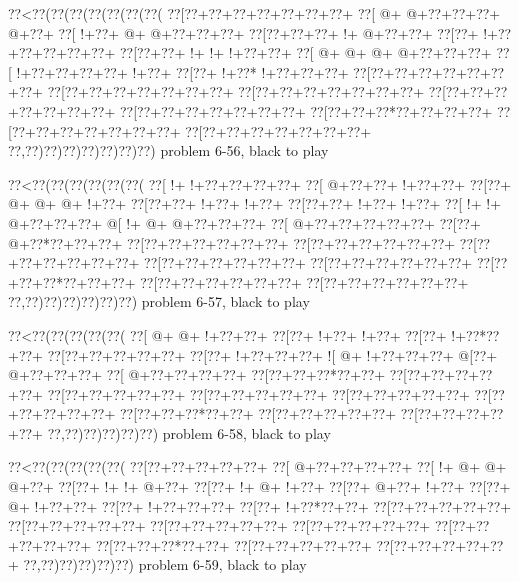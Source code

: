 \vbox{\vbox{\goo
\0??<\0??(\0??(\0??(\0??(\0??(\0??(\0??(
\0??[\0??+\0??+\0??+\0??+\0??+\0??+\0??+
\0??[\- @+\- @+\0??+\0??+\0??+\- @+\0??+
\0??[\- !+\0??+\- @+\- @+\0??+\0??+\0??+
\0??[\0??+\0??+\0??+\- !+\- @+\0??+\0??+
\0??[\0??+\- !+\0??+\0??+\0??+\0??+\0??+
\0??[\0??+\0??+\- !+\- !+\- !+\0??+\0??+
\0??[\- @+\- @+\- @+\- @+\0??+\0??+\0??+
\0??[\- !+\0??+\0??+\0??+\0??+\- !+\0??+
\0??[\0??+\- !+\0??*\- !+\0??+\0??+\0??+
\0??[\0??+\0??+\0??+\0??+\0??+\0??+\0??+
\0??[\0??+\0??+\0??+\0??+\0??+\0??+\0??+
\0??[\0??+\0??+\0??+\0??+\0??+\0??+\0??+
\0??[\0??+\0??+\0??+\0??+\0??+\0??+\0??+
\0??[\0??+\0??+\0??+\0??+\0??+\0??+\0??+
\0??[\0??+\0??+\0??*\0??+\0??+\0??+\0??+
\0??[\0??+\0??+\0??+\0??+\0??+\0??+\0??+
\0??[\0??+\0??+\0??+\0??+\0??+\0??+\0??+
\0??,\0??)\0??)\0??)\0??)\0??)\0??)\0??)
}
\hfil problem 6-56, black to play\hfil\break
}

\vbox{\vbox{\goo
\0??<\0??(\0??(\0??(\0??(\0??(\0??(
\0??[\- !+\- !+\0??+\0??+\0??+\0??+
\0??[\- @+\0??+\0??+\- !+\0??+\0??+
\0??[\0??+\- @+\- @+\- @+\- !+\0??+
\0??[\0??+\0??+\- !+\0??+\- !+\0??+
\0??[\0??+\0??+\- !+\0??+\- !+\0??+
\0??[\- !+\- !+\- @+\0??+\0??+\0??+
\- @[\- !+\- @+\- @+\0??+\0??+\0??+
\0??[\- @+\0??+\0??+\0??+\0??+\0??+
\0??[\0??+\- @+\0??*\0??+\0??+\0??+
\0??[\0??+\0??+\0??+\0??+\0??+\0??+
\0??[\0??+\0??+\0??+\0??+\0??+\0??+
\0??[\0??+\0??+\0??+\0??+\0??+\0??+
\0??[\0??+\0??+\0??+\0??+\0??+\0??+
\0??[\0??+\0??+\0??+\0??+\0??+\0??+
\0??[\0??+\0??+\0??*\0??+\0??+\0??+
\0??[\0??+\0??+\0??+\0??+\0??+\0??+
\0??[\0??+\0??+\0??+\0??+\0??+\0??+
\0??,\0??)\0??)\0??)\0??)\0??)\0??)
}
\hfil problem 6-57, black to play\hfil\break
}

\vbox{\vbox{\goo
\0??<\0??(\0??(\0??(\0??(\0??(
\0??[\- @+\- @+\- !+\0??+\0??+
\0??[\0??+\- !+\0??+\- !+\0??+
\0??[\0??+\- !+\0??*\0??+\0??+
\0??[\0??+\0??+\0??+\0??+\0??+
\0??[\0??+\- !+\0??+\0??+\0??+
\- ![\- @+\- !+\0??+\0??+\0??+
\- @[\0??+\- @+\0??+\0??+\0??+
\0??[\- @+\0??+\0??+\0??+\0??+
\0??[\0??+\0??+\0??*\0??+\0??+
\0??[\0??+\0??+\0??+\0??+\0??+
\0??[\0??+\0??+\0??+\0??+\0??+
\0??[\0??+\0??+\0??+\0??+\0??+
\0??[\0??+\0??+\0??+\0??+\0??+
\0??[\0??+\0??+\0??+\0??+\0??+
\0??[\0??+\0??+\0??*\0??+\0??+
\0??[\0??+\0??+\0??+\0??+\0??+
\0??[\0??+\0??+\0??+\0??+\0??+
\0??,\0??)\0??)\0??)\0??)\0??)
}
\hfil problem 6-58, black to play\hfil\break
}

\vbox{\vbox{\goo
\0??<\0??(\0??(\0??(\0??(\0??(
\0??[\0??+\0??+\0??+\0??+\0??+
\0??[\- @+\0??+\0??+\0??+\0??+
\0??[\- !+\- @+\- @+\- @+\0??+
\0??[\0??+\- !+\- !+\- @+\0??+
\0??[\0??+\- !+\- @+\- !+\0??+
\0??[\0??+\- @+\0??+\- !+\0??+
\0??[\0??+\- @+\- !+\0??+\0??+
\0??[\0??+\- !+\0??+\0??+\0??+
\0??[\0??+\- !+\0??*\0??+\0??+
\0??[\0??+\0??+\0??+\0??+\0??+
\0??[\0??+\0??+\0??+\0??+\0??+
\0??[\0??+\0??+\0??+\0??+\0??+
\0??[\0??+\0??+\0??+\0??+\0??+
\0??[\0??+\0??+\0??+\0??+\0??+
\0??[\0??+\0??+\0??*\0??+\0??+
\0??[\0??+\0??+\0??+\0??+\0??+
\0??[\0??+\0??+\0??+\0??+\0??+
\0??,\0??)\0??)\0??)\0??)\0??)
}
\hfil problem 6-59, black to play\hfil\break
}

